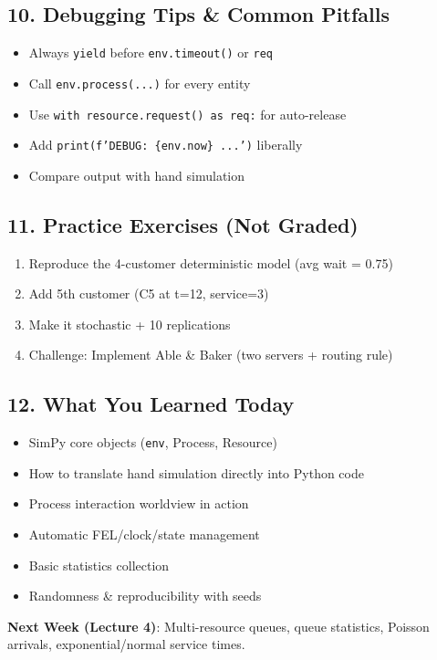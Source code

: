 \documentclass[11pt]{article}
\begin{document}
\subsection*{10. Debugging Tips \& Common Pitfalls}
\begin{itemize}[leftmargin=*]
\item Always \texttt{yield} before \texttt{env.timeout()} or \texttt{req}  
\item Call \texttt{env.process(...)} for every entity  
\item Use \texttt{with resource.request() as req:} for auto-release  
\item Add \texttt{print(f'DEBUG: \{env.now\} ...')} liberally  
\item Compare output with hand simulation
\end{itemize}

\subsection*{11. Practice Exercises (Not Graded)}
\begin{enumerate}[leftmargin=*]
\item Reproduce the 4-customer deterministic model (avg wait = 0.75)  
\item Add 5th customer (C5 at t=12, service=3)  
\item Make it stochastic + 10 replications  
\item Challenge: Implement Able \& Baker (two servers + routing rule)
\end{enumerate}

\subsection*{12. What You Learned Today}
\begin{itemize}[leftmargin=*]
\item SimPy core objects (\texttt{env}, Process, Resource)  
\item How to translate hand simulation directly into Python code  
\item Process interaction worldview in action  
\item Automatic FEL/clock/state management  
\item Basic statistics collection  
\item Randomness \& reproducibility with seeds  
\end{itemize}

\textbf{Next Week (Lecture 4)}: Multi-resource queues, queue statistics, Poisson arrivals, exponential/normal service times.
\end{document}
